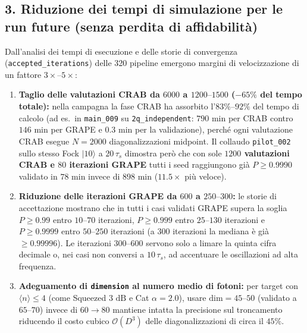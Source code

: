 \documentclass[11pt,a4paper]{article}
\begin{document}
\subsection*{3. Riduzione dei tempi di simulazione per le run future (senza perdita di affidabilità)}
Dall'analisi dei tempi di esecuzione e delle storie di convergenza (\texttt{accepted\_iterations}) delle 320 pipeline emergono margini di velocizzazione di un fattore $3\times\text{--}5\times$:
\begin{enumerate}
    \item \textbf{Taglio delle valutazioni CRAB da $6000$ a $1200\text{--}1500$ ($-65\%$ del tempo totale):} nella campagna la fase CRAB ha assorbito l'$83\%\text{--}92\%$ del tempo di calcolo (ad es.\ in \texttt{main\_009} su \texttt{2q\_independent}: $790\text{ min}$ per CRAB contro $146\text{ min}$ per GRAPE e $0.3\text{ min}$ per la validazione), perché ogni valutazione CRAB esegue $N=2000$ diagonalizzazioni midpoint. Il collaudo \texttt{pilot\_002} sullo stesso Fock $|10\rangle$ a $20\,\tau_s$ dimostra però che con sole \textbf{$1200$ valutazioni CRAB e $80$ iterazioni GRAPE} tutti i seed raggiungono già $P \ge 0.9990$ validato in $78\text{ min}$ invece di $898\text{ min}$ ($11.5\times$ più veloce).
    \item \textbf{Riduzione delle iterazioni GRAPE da $600$ a $250\text{--}300$:} le storie di accettazione mostrano che in tutti i casi validati GRAPE supera la soglia $P \ge 0.99$ entro $10\text{--}70$ iterazioni, $P \ge 0.999$ entro $25\text{--}130$ iterazioni e $P \ge 0.9999$ entro $50\text{--}250$ iterazioni (a $300$ iterazioni la mediana è già $\ge 0.99996$). Le iterazioni $300\text{--}600$ servono solo a limare la quinta cifra decimale o, nei casi non conversi a $10\,\tau_s$, ad accentuare le oscillazioni ad alta frequenza.
    \item \textbf{Adeguamento di \texttt{dimension} al numero medio di fotoni:} per target con $\langle n\rangle \le 4$ (come Squeezed $3\text{ dB}$ e Cat $\alpha=2.0$), usare $\text{dim}=45\text{--}50$ (validato a $65\text{--}70$) invece di $60\to 80$ mantiene intatta la precisione sul troncamento riducendo il costo cubico $\mathcal{O}(D^3)$ delle diagonalizzazioni di circa il $45\%$.
\end{enumerate}
\end{document}
